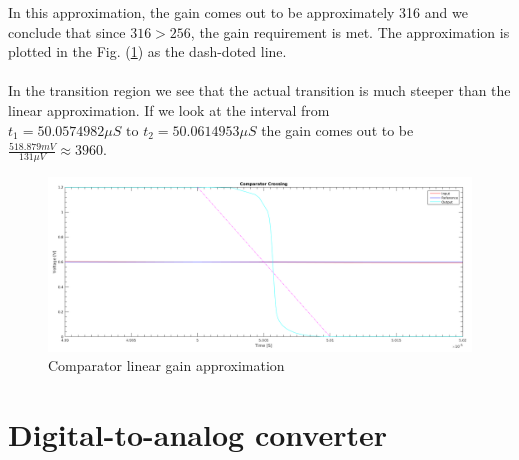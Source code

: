 \documentclass[english, 12pt, a4paper]{ifimaster}
\begin{document}
\noindent
In this approximation, the gain comes out to be approximately 316 and we conclude that since \( 316 > 256 \), the gain requirement is met. 
The approximation is plotted in the Fig. (\ref{figure:comparator:comparator_linear_approx}) as the dash-doted line.\\
\\
In the transition region we see that the actual transition is much steeper than the linear approximation. 
If we look at the interval from \(t_1 = 50.0574982\mu S \textrm{ to } t_2 = 50.0614953\mu S\) the gain comes out to be \(\frac{518.879mV}{131\mu V} \approx 3960\). 
\begin{figure}[!ht]
    \centering
    \includegraphics[width=\textwidth]{img/comparator/comparator_crossing_full_with_linear_approx}
    \caption{Comparator linear gain approximation}
    \label{figure:comparator:comparator_linear_approx}
\end{figure}

\section{Digital-to-analog converter}
\end{document}
